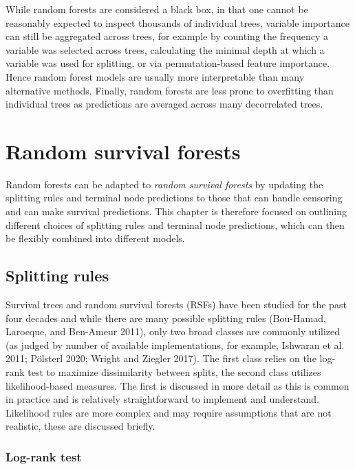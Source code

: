 \documentclass[
  letterpaper,
  krantz2]{style/krantz}
\begin{document}
While random forests are considered a black box, in that one cannot be
reasonably expected to inspect thousands of individual trees, variable
importance can still be aggregated across
trees, for example by counting the frequency a variable was selected
across trees, calculating the minimal depth at which a variable was used
for splitting, or via permutation-based feature importance. Hence random
forest models are usually more interpretable than many alternative
methods. Finally, random forests are less prone to overfitting than
individual trees as predictions are averaged across many decorrelated
trees.

\section{Random survival forests}\label{random-survival-forests}

Random forests can be adapted to \emph{random survival forests} by
updating the splitting rules and terminal node predictions to those that
can handle censoring and can make survival
predictions. This chapter is therefore
focused on outlining different choices of splitting rules and terminal
node predictions, which can then be flexibly combined into different
models.

\subsection{Splitting rules}\label{splitting-rules}

Survival trees and random survival forests (RSFs) have been studied for
the past four decades and while there are many possible splitting rules
(Bou-Hamad, Larocque, and Ben-Ameur 2011), only two broad classes are
commonly utilized (as judged by number of available implementations, for
example, Ishwaran et al. 2011; Pölsterl 2020; Wright and Ziegler 2017).
 The first class relies
on the log-rank
test to
maximize dissimilarity between splits, the second class utilizes
likelihood-based measures. The first is discussed in more detail as this
is common in practice and is relatively straightforward to implement and
understand. Likelihood rules are more complex and may require
assumptions that are not realistic, these are discussed briefly.

\subsubsection{Log-rank test}\label{log-rank-test}
\end{document}
